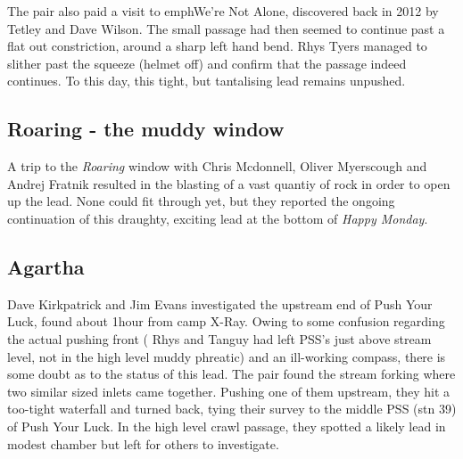 The pair also paid a visit to emph{We're Not Alone}, discovered back in 2012 by Tetley and Dave Wilson. The small passage had then seemed to continue past a flat out constriction, around a sharp left hand bend. Rhys Tyers managed to slither past the squeeze (helmet off) and confirm that the passage indeed continues. To this day, this tight, but tantalising lead remains unpushed.

\subsection{Roaring - the muddy window}
A trip to the \emph{Roaring} window with Chris Mcdonnell, Oliver Myerscough and Andrej Fratnik resulted in the blasting of a vast quantiy of rock in order to open up the lead. None could fit through yet, but they reported the ongoing continuation of this draughty, exciting lead at the bottom of \emph{Happy Monday}.


\subsection{Agartha}
Dave Kirkpatrick and Jim Evans investigated the upstream end of Push Your Luck, found about 1hour from camp X-Ray. Owing to some confusion regarding the actual pushing front ( Rhys and Tanguy had left PSS's just above stream level, not in the high level muddy phreatic) and an ill-working compass, there is some doubt as to the status of this lead. The pair found the stream forking where two similar sized inlets came together. Pushing one of them upstream, they hit a too-tight waterfall and turned back, tying their survey to the middle PSS (stn 39) of Push Your Luck. In the high level crawl passage, they spotted a likely lead in modest chamber but left for others to investigate.

